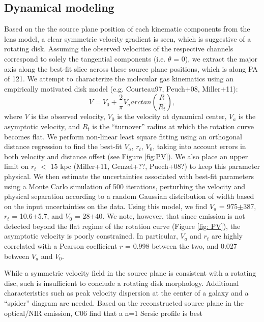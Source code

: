 \documentclass[]{emulateapj}
\begin{document}
\subsection{\bco Dynamical modeling}
Based on the the source plane position of each kinematic components from the
lens model, a clear symmetric velocity gradient is seen, which is suggestive of a rotating disk. Assuming the observed velocities of the respective channels
correspond to solely the tangential components (i.e. $\theta$ = 0), we extract
the major axis along the best-fit slice across these source plane positions,
which is along PA of 121\degr.
We attempt to characterize the molecular gas kinematics using an empirically motivated disk model (e.g. Courteau97, Peuch+08, Miller+11):
\begin{equation}
V = V_0 + \frac{2}{\pi} V_a arctan(\frac{R}{R_t}),
\end{equation}
where $V$ is the observed velocity, $V_0$ is the velocity at dynamical center, $V_a$ is the asymptotic velocity, and $R_t$ is the ``turnover'' radius at which the rotation curve
becomes flat. We perform non-linear least square fitting using an orthogonal distance regression to find the best-fit $V_a$, $r_t$, $V_0$, taking into account
errors in both velocity and distance offset (see Figure \ref{fig:PV}). We also place an upper limit on $r_t$ $<$ 15 kpc (Miller+11, Genzel+??, Puech+08?) to keep this
parameter physical. We then estimate the uncertainties associated with best-fit parameters using a Monte Carlo simulation of 500 iterations, perturbing
the velocity and physical separation according to a random Gaussian distribution of width based on the input uncertainties on
the data. Using this model, we find $V_a$ = 975$\pm$387, $r_t$ = 10.6$\pm$5.7,
and $V_0$ = 28$\pm$40. We note, however, that since emission is not detected beyond the flat regime of the rotation curve (Figure \ref{fig: PV}), the asymptotic velocity is
poorly constrained. In particular, $V_a$ and $r_t$ are highly correlated with a Pearson coefficient $r$ = 0.998 between the two, and 0.027 between $V_a$ and $V_0$.

While a symmetric velocity field in the source plane is consistent with a rotating disc, such is insufficient to conclude a rotating disk morphology. Additional characteristics such
as peak velocity dispersion at the center of a galaxy and a ``spider'' diagram are needed. Based on the reconstructed source plane in the optical/NIR emission, C06 find that a
n=1 Sersic profile is best
\end{document}
